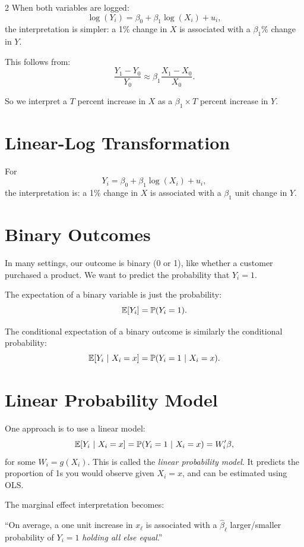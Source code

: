 \documentclass[12pt]{article}
\begin{document}
\begin{multicols}{2}
  When both variables are logged:
  $$\log(Y_i) = \beta_0 + \beta_1 \log(X_i) + u_i,$$
  the interpretation is simpler: a 1\% change in $X$ is associated with a $\beta_1$\% change in $Y$.

  This follows from:
  $$\frac{Y_1 - Y_0}{Y_0} \approx \beta_1 \frac{X_1 - X_0}{X_0}.$$

  So we interpret a $T$ percent increase in $X$ as a $\beta_1 \times T$ percent increase in $Y$.

  \section*{Linear-Log Transformation}

  For
  $$Y_i = \beta_0 + \beta_1 \log(X_i) + u_i,$$
  the interpretation is: a 1\% change in $X$ is associated with a $\beta_1$ unit change in $Y$.

  \section*{Binary Outcomes}

  In many settings, our outcome is binary (0 or 1), like whether a customer purchased a product. We want to predict the probability that $Y_i = 1$.

  The expectation of a binary variable is just the probability:
  $$\expec{Y_i} = \prob{Y_i = 1}.$$

  The conditional expectation of a binary outcome is similarly the conditional probability:
  $$\expec{Y_i}{X_i = x} = \prob{Y_i = 1}{X_i = x}.$$

  \section*{Linear Probability Model}

  One approach is to use a linear model:
  $$\expec{Y_i}{X_i = x} = \prob{Y_i = 1}{X_i = x} = W_i' \beta,$$
  for some $W_i = g(X_i)$. This is called the \emph{linear probability model}. It predicts the proportion of 1s you would observe given $X_i = x$, and can be estimated using OLS.

  The marginal effect interpretation becomes:

    ``On average, a one unit increase in $x_\ell$ is associated with a $\hat{\beta}_\ell$ larger/smaller probability of $Y_i = 1$ \emph{holding all else equal}.''


\end{multicols}
\end{document}
